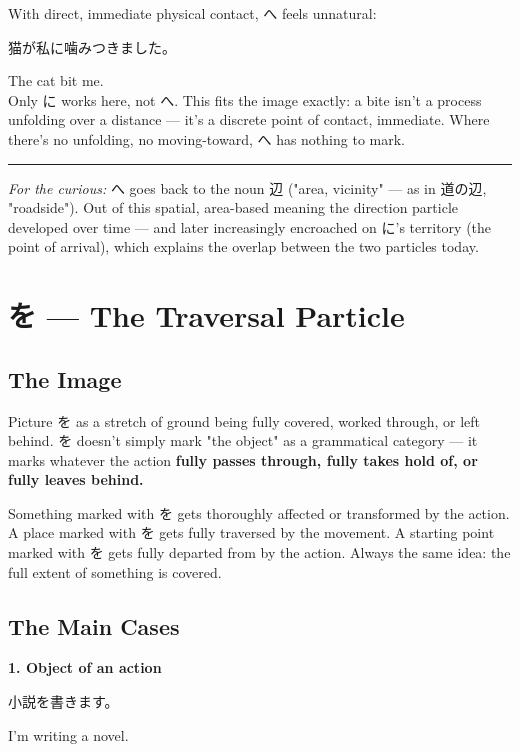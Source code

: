 \documentclass[12pt]{book}
\begin{document}
With direct, immediate physical contact, へ feels unnatural:

\par\quad 猫が私に噛みつきました。\\
\par\quad The cat bit me.\\

Only に works here, not へ. This fits the image exactly: a bite isn't a process unfolding over a distance — it's a discrete point of contact, immediate. Where there's no unfolding, no moving-toward, へ has nothing to mark.

\bigskip\hrule\bigskip

\emph{For the curious:} へ goes back to the noun 辺 ("area, vicinity" — as in 道の辺, "roadside"). Out of this spatial, area-based meaning the direction particle developed over time — and later increasingly encroached on に's territory (the point of arrival), which explains the overlap between the two particles today.


\chapter{を — The Traversal Particle}

\section*{The Image}

Picture を as a stretch of ground being fully covered, worked through, or left behind. を doesn't simply mark "the object" as a grammatical category — it marks whatever the action \textbf{fully passes through, fully takes hold of, or fully leaves behind.}

Something marked with を gets thoroughly affected or transformed by the action. A place marked with を gets fully traversed by the movement. A starting point marked with を gets fully departed from by the action. Always the same idea: the full extent of something is covered.

\section*{The Main Cases}

\textbf{1. Object of an action}
\par\quad 小説を書きます。\\
\par\quad I'm writing a novel.\\
\end{document}
